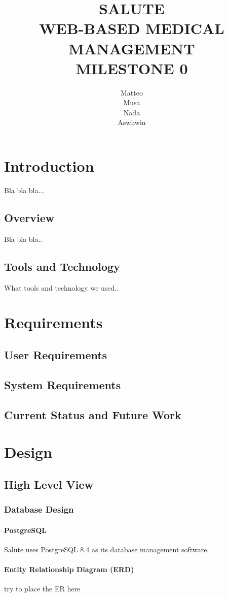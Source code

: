 \documentclass[12pt]{report}
\title{SALUTE \\ WEB-BASED MEDICAL MANAGEMENT \\ MILESTONE 0}
\author{Matteo \\ Musa \\ Nada \\ Aswhwin}
\begin{document}
\maketitle
\tableofcontents


\chapter{Introduction}
Bla bla bla...
\section{Overview}
Bla bla bla..
\section{Tools and Technology}
What tools and technology we used..


\chapter{Requirements}
\section{User Requirements}
\section{System Requirements}
\section{Current Status and Future Work}


\chapter{Design}
\section{High Level View}
\subsection{Database Design}
\subsubsection{PostgreSQL}
Salute uses PostgreSQL 8.4 as its database management software.

\subsubsection{Entity Relationship Diagram (ERD)}
try to place the ER here
\end{document}
